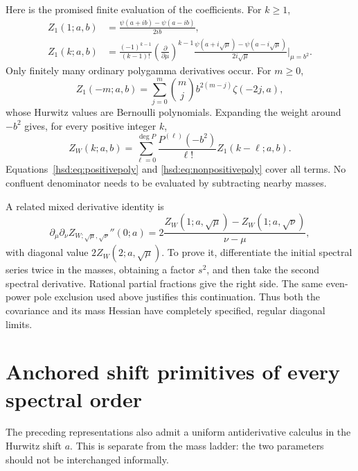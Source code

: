 \documentclass[11pt]{article}
\numberwithin{equation}{section}
\theoremstyle{definition}\newtheorem{definition}[theorem]{Definition}
\theoremstyle{remark}\newtheorem{remark}[theorem]{Remark}
\begin{document}
Here is the promised finite evaluation of the coefficients. For $k\ge1$,
\begin{align}
 Z_1(1;a,b)&=\frac{\psi(a+ib)-\psi(a-ib)}{2ib},\label{hsd:eq:resolvent}\\
 Z_1(k;a,b)&=\frac{(-1)^{k-1}}{(k-1)!}
   \left(\frac{\partial}{\partial\mu}\right)^{k-1}
   \frac{\psi(a+i\sqrt\mu)-\psi(a-i\sqrt\mu)}{2i\sqrt\mu}\bigg|_{\mu=b^2}.
   \label{hsd:eq:positivepoly}
\end{align}
Only finitely many ordinary polygamma derivatives occur. For $m\ge0$,
\begin{equation}\label{hsd:eq:nonpositivepoly}
 Z_1(-m;a,b)=\sum_{j=0}^m\binom mj b^{2(m-j)}\zeta(-2j,a),
\end{equation}
whose Hurwitz values are Bernoulli polynomials. Expanding the weight
around $-b^2$ gives, for every positive integer $k$,
\begin{equation}\label{hsd:eq:weightedresolvent}
 Z_W(k;a,b)=\sum_{\ell=0}^{\deg P}\frac{P^{(\ell)}(-b^2)}{\ell!}
                                        Z_1(k-\ell;a,b).
\end{equation}
Equations~\eqref{hsd:eq:positivepoly} and
\eqref{hsd:eq:nonpositivepoly} cover all terms. No confluent denominator
needs to be evaluated by subtracting nearby masses.

A related mixed derivative identity is
\begin{equation}\label{hsd:eq:mixedmass}
 \partial_\mu\partial_\nu Z_{W;\sqrt\mu,\sqrt\nu}''(0;a)
   =2\frac{Z_W(1;a,\sqrt\mu)-Z_W(1;a,\sqrt\nu)}{\nu-\mu},
\end{equation}
with diagonal value $2Z_W(2;a,\sqrt\mu)$. To prove it, differentiate the
initial spectral series twice in the masses, obtaining a factor $s^2$,
and then take the second spectral derivative. Rational partial fractions
give the right side. The same even-power pole exclusion used above
justifies this continuation. Thus both the covariance and its mass
Hessian have completely specified, regular diagonal limits.

\section{Anchored shift primitives of every spectral order}
\label{hsd:sec:primitives}
The preceding representations also admit a uniform antiderivative
calculus in the Hurwitz shift $a$. This is separate from the mass ladder:
the two parameters should not be interchanged informally.
\end{document}
